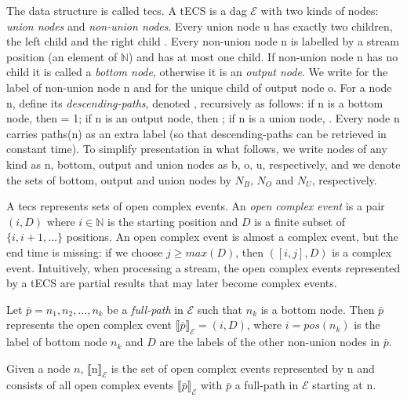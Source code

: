 The data structure is called \acrfull{tecs}. A tECS is a \acrfull{dag} $\mathcal{E}$ with two kinds of nodes: \emph{union nodes} and \emph{non-union nodes}. Every union node \textrm{u} has exactly two children, the left child  and the right child . Every non-union node \textrm{n} is labelled by a stream position (an element of $\mathbb{N}$) and has at most one child. If non-union node \textrm{n} has no child it is called a \emph{bottom node}, otherwise it is an \emph{output node}. We write  for the label of non-union node \textrm{n} and  for the unique child of output node \textrm{o}. For a node \textrm{n}, define its \emph{descending-paths}, denoted , recursively as follows: if \textrm{n} is a bottom node, then  = 1; if \textrm{n} is an output node, then ; if \textrm{n} is a union node, . Every node \textrm{n} carries paths(\textrm{n}) as an extra label (so that descending-paths can be retrieved in constant time). To simplify presentation in what follows, we write nodes of any kind as \textrm{n}, bottom, output and union nodes as \textrm{b, o, u}, respectively, and we denote the sets of bottom, output and union nodes by $N_{B}$, $N_{O}$ and $N_{U}$, respectively.

A \acrshort{tecs} represents sets of open complex events. An \emph{open complex event} is a pair $(i, D)$ where $i \in \mathbb{N}$ is the starting position and $D$ is a finite subset of $\{i, i+1, \ldots\}$ positions. An open complex event is almost a complex event, but the end time is missing: if we choose $j \ge max(D)$, then $([i, j], D)$ is a complex event. Intuitively, when processing a stream, the open complex events represented by a tECS are partial results that may later become complex events.

Let $\bar{p} = n_{1}, n_{2}, \ldots, n_{k}$ be a \emph{full-path} in $\mathcal{E}$ such that $n_{k}$ is a bottom node. Then $\bar{p}$ represents the open complex event ${\llbracket \bar{p} \rrbracket}_{\mathcal{E}} = (i, D)$, where $i = pos(n_{k})$ is the label of bottom node $n_{k}$ and $D$ are the labels of the other non-union nodes in $\bar{p}$.

Given a node $n$, ${\llbracket \textrm{n} \rrbracket}_{\mathcal{E}}$ is the set of open complex events represented by \textrm{n} and consists of all open complex events ${\llbracket \bar{p} \rrbracket}_{\mathcal{E}}$ with $\bar{p}$ a full-path in $\mathcal{E}$ starting at \textrm{n}.

